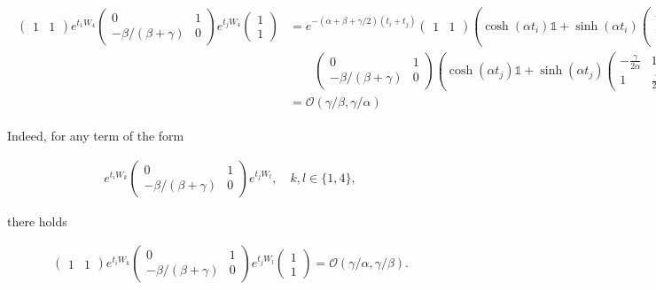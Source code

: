 \small
\begin{align}
\begin{split}
\begin{pmatrix} 1 & 1 \end{pmatrix} e^{t_1 W_4} \begin{pmatrix}0 & 1 \\ -\beta/(\beta + \gamma) & 0\end{pmatrix} e^{t_j W_4} \begin{pmatrix} 1 \\ 1 \end{pmatrix} &= e^{-(\alpha + \beta + \gamma/2)(t_i+t_j)}\begin{pmatrix} 1 & 1 \end{pmatrix}\left(\cosh(\alpha t_i) \mathds{1} + \sinh(\alpha t_i) \begin{pmatrix} -\frac{\gamma}{2\alpha} & 1 \\ 1 & \frac{\gamma}{2\alpha}\end{pmatrix}\right)\\ &\quad \quad \begin{pmatrix}0 & 1 \\ -\beta/(\beta + \gamma) & 0\end{pmatrix}\left(\cosh(\alpha t_j) \mathds{1} + \sinh(\alpha t_j) \begin{pmatrix} -\frac{\gamma}{2\alpha} & 1 \\ 1 & \frac{\gamma}{2\alpha}\end{pmatrix}\right) \begin{pmatrix} 1 \\ 1 \end{pmatrix} \\ 
&= \mathcal{O}(\gamma/\beta, \gamma/\alpha)
\end{split}
\end{align}

Indeed, for any term of the form 

\begin{align}\label{terms-single}
e^{t_i W_k} \begin{pmatrix}0 & 1 \\ -\beta/(\beta + \gamma) & 0\end{pmatrix} e^{t_j W_l}, \quad k,l \in \{1,4\}, 
\end{align}

there holds 

\begin{align} 
\begin{pmatrix} 1 & 1 \end{pmatrix}e^{t_i W_k} \begin{pmatrix}0 & 1 \\ -\beta/(\beta + \gamma) & 0\end{pmatrix} e^{t_j W_l}\begin{pmatrix} 1 \\ 1 \end{pmatrix} = \mathcal{O}(\gamma/\alpha,\gamma/\beta). 
\end{align}

